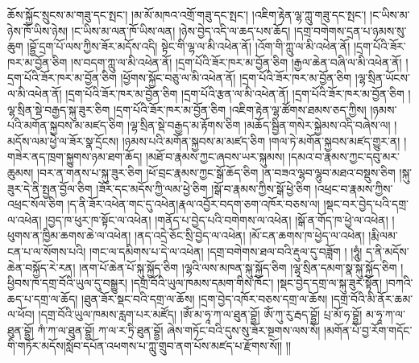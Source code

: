 ཆོས་སྐྱོང་སྲུངས་མ་གཟུ་དང་སྤང་། །མ་མོ་མཁའ་འགྲོ་གཟུ་དང་སྤང་། །འཇིག་རྟེན་ལྷ་ཀླུ་གཟུ་དང་སྤང་། །ང་ཡིས་མ་ཉེས་ཁོ་ཡིས་ཉེས། །ང་ཡིས་མ་ལན་ཁོ་ཡིས་ལན། །ཉེས་བྱེད་འདི་ལ་ཆད་པས་ཆོད། །དགྲ་བགེགས་དྲན་པ་ཉམས་སུ་ཆུག །བྷྱོ་དྲག་པོ་ལས་ཀྱིས་ཟོར་མདོས་འདི། སྟེང་གི་ལྷ་ལ་མི་འཕེན་ནོ། །འོག་གི་ཀླུ་ལ་མི་འཕེན་ནོ། །དྲག་པོའི་ཟོར་ཁར་མ་བྱོན་ཅིག །ས་བདག་ཀླུ་ལ་མི་འཕེན་ནོ། །དྲག་པོའི་ཟོར་ཁར་མ་བྱོན་ཅིག །རྒྱལ་ཆེན་བཞི་ལ་མི་འཕེན་ནོ། །དྲག་པོའི་ཟོར་ཁར་མ་བྱོན་ཅིག །ཕྱོགས་སྐྱོང་བཅུ་ལ་མི་འཕེན་ནོ། །དྲག་པོའི་ཟོར་ཁར་མ་བྱོན་ཅིག །ལྷ་སྲིན་ཡོངས་ལ་མི་འཕེན་ནོ། །དྲག་པོའི་ཟོར་ཁར་མ་བྱོན་ཅིག །དྲག་པོའི་རྩན་ལ་མི་འཕེན་ནོ། །དྲག་པོའི་ཟོར་ཁར་མ་བྱོན་ཅིག །ལྷ་སྲིན་སྡེ་བརྒྱད་སྐུ་ཟུར་ཅིག །དྲག་པོའི་ཟོར་ཁར་མ་བྱོན་ཅིག །འཇིག་རྟེན་ལྷ་ཚོགས་ཐམས་ཅད་ཀྱིས། །ཉམས་པའི་མགོན་སྐྱབས་མ་མཛད་ཅིག །ལྷ་སྲིན་སྡེ་བརྒྱད་མ་རྟོགས་ཅིག །མཆོད་སྦྱིན་གསེར་སྐྱེམས་འདི་བཞེས་ལ། །མདོས་ལམ་ཕྱེ་ལ་ཟོར་སྣ་དྲོངས། །ཉམས་པའི་མགོན་སྐྱབས་མ་མཛད་ཅིག །གལ་ཏེ་མགོན་སྐྱབས་མཛད་གྱུར་ན། །གཟེར་ནད་ཁྲག་སྐྱུགས་ཉམ་ཐག་ཆོད། །མཐོ་བ་རྣམས་ཀྱང་ཞབས་ཡར་སྐུམས། །དམའ་བ་རྣམས་ཀྱང་དབུ་མར་ཆུམས། །བར་ན་གནས་པ་སྐུ་ཟུར་ཅིག །ཕོ་བྲང་རྣམས་ཀྱང་སྒོ་ཆོད་ཅིག །ན་བཟའ་ལྷབ་ལྷུབ་མཐའ་བསྡུས་ཅིག །སྐུ་ཟུར་དེ་ནི་སྤྱན་བྱོལ་ཅིག །ཟོར་དང་མདོས་ཀྱི་ལམ་ཕྱེ་ཅིག །སྒོ་བ་རྣམས་ཀྱིས་སྒོ་ཕྱེ་ཅིག །འཕྲང་བ་རྣམས་ཀྱིས་འཕྲང་སོལ་ཅིག །ད་ནི་ཟོར་འཕེན་གང་དུ་འཕེན།རྣལ་འབྱོར་བདག་ཅག་འཁོར་བཅས་ལ། །སྡང་བར་བྱེད་པའི་དགྲ་ལ་འཕེན། །བྱད་ཁ་ཕུར་ཁ་སྟོང་ལ་འཕེན། །གནོད་པ་བྱེད་པའི་བགེགས་ལ་འཕེན། །སྒོ་ན་གོད་ཁ་ཕྱེ་ལ་འཕེན། །ཕུགས་ན་ཁྱིམ་ཆགས་ཆེ་ལ་འཕེན། །ནད་འདྲེ་ཅོང་སྲི་བྱེད་ལ་འཕེན། །མོ་ངན་ཆགས་ཁ་ཕྱེད་ལ་འཕེན། །རྨི་ལམ་ངན་པ་ལ་སོགས་པའི། །གང་ལ་དམིགས་པ་དེ་ལ་འཕེན། །དགྲ་བགེགས་ཐལ་བའི་རྡུལ་དུ་བཟློག ། །ཧཱུཾ། ད་ནི་མདོས་ཆེན་བསྐྱོད་རེ་རན། །ནག་པོ་ཆེན་པོ་སྐུ་སྐྱོད་ཅིག །ལྷའི་ལས་མཁན་སྐུ་སྐྱོད་ཅིག །ལྷ་སྲིན་དམག་སྣ་སྐུ་སྐྱོད་ཅིག །ཕྱིབས་ཁ་དགྲ་བོའི་ཡུལ་དུ་བསྒྱུར། །དགྲ་བོའི་ཡུལ་ཁམས་དམག་གིས་ཁོང་། །སྡང་བྱེད་དགྲ་ལ་སྐུ་ཟུར་སྟོན། །བཀའི་ཆད་པ་དགྲ་ལ་ཆོད། །ཐུན་ཟོར་སྡང་བའི་དགྲ་ལ་ཆོས། །དྲག་བྱེད་འཁོར་བཅས་དགྲ་ལ་ཆོས། །དགྲ་བོའི་མི་ནོར་ཆམ་ལ་ཕོབ། །དགྲ་བོའི་ཡུལ་ཁམས་རླག་པར་མཛོད། །ཨོཾ་མ་ཧཱ་ཀ་ལ་ཐུན་བྷྱོ། ཨོཾ་ཀུ་རུ་རྦད་བྷྱོ། པྲ་མོ་ཧ་བྷྱོ། མ་ཧཱ་ཀ་ལ་ཐུན་བྷྱོ། ཀཾ་ཀ་ལ་ཐུན་བྷྱོ། ཀ་ལ་ར་ཏྲི་ཐུན་བྷྱོ། ཞེས་གཏོང་བའི་དུས་སུ་ཟོར་སྔགས་ལས་སོ། །མགོན་པོ་བྱ་རོག་གདོང་གི་གཏོར་མདོས།སློབ་དཔོན་འཕགས་པ་ཀླུ་གྲུབ་ནག་པོས་མཛད་པ་རྫོགས་སོ།། །།